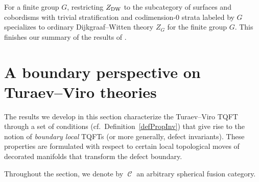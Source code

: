 \documentclass[pdftex]{sigma}
\DeclareMathOperator{\calc}{\mathcal{C}}
\numberwithin{equation}{section}
\theoremstyle{definition}
\begin{document}
For a finite group $G$, restricting $Z_{\rm DW}$ to the subcategory of surfaces and cobordisms with trivial stratification and codimension-0 strata labeled by $G$ specializes to ordinary Dijkgraaf--Witten theory $Z_G$ for the finite group $G$. This finishes our summary of the results of \cite{FMM}.

\section{A boundary perspective on Turaev--Viro theories}
\label{secTVRes}
The results we develop in this section characterize the Turaev--Viro TQFT through a set of conditions (cf.\ Definition~\ref{defPropInv}) that give rise to the notion of \textit{boundary local} TQFTs (or more generally, defect invariants). These properties are formulated with respect to certain local topological moves of decorated manifolds that transform the defect boundary.

Throughout the section, we denote by $\calc$ an arbitrary spherical fusion category.
\end{document}
